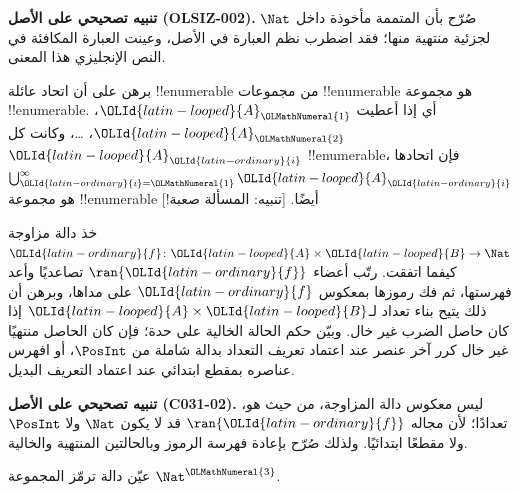 \documentclass[../../../include/open-logic-section]{subfiles}
\begin{document}
\begin{editorial}
\textbf{تنبيه تصحيحي على الأصل (OLSIZ-002).} صُرّح بأن المتممة مأخوذة
داخل $\Nat$ لجزئية منتهية منها؛ فقد اضطرب نظم العبارة في الأصل،
وعينت العبارة المكافئة في النص الإنجليزي هذا المعنى.
\end{editorial}

\begin{prob}
برهن على أن اتحاد عائلة !!{enumerable} من مجموعات !!{enumerable}
هو مجموعة !!{enumerable}. أي إذا أعطيت ${\OLId{latin-looped}{A}}_{\OLMathNumeral{1}}$، ${\OLId{latin-looped}{A}}_{\OLMathNumeral{2}}$، \dots{}، وكانت كل
${\OLId{latin-looped}{A}}_{\OLId{latin-ordinary}{i}}$ !!{enumerable}، فإن اتحادها $\bigcup_{{\OLId{latin-ordinary}{i}}={\OLMathNumeral{1}}}^\infty
{\OLId{latin-looped}{A}}_{\OLId{latin-ordinary}{i}}$ هو مجموعة !!{enumerable} أيضًا. [تنبيه: المسألة صعبة!]
\end{prob}

\begin{prob}
خذ دالة مزاوجة ${\OLId{latin-ordinary}{f}} \colon {\OLId{latin-looped}{A}} \times {\OLId{latin-looped}{B}} \to \Nat$ كيفما اتفقت.
رتّب أعضاء $\ran{{\OLId{latin-ordinary}{f}}}$ تصاعديًا وأعد فهرستها، ثم فك رموزها بمعكوس ${\OLId{latin-ordinary}{f}}$
على مداها، وبرهن أن ذلك يتيح بناء تعداد لـ${\OLId{latin-looped}{A}} \times {\OLId{latin-looped}{B}}$ إذا كان حاصل
الضرب غير خال. وبيّن حكم الحالة الخالية على حدة؛ فإن كان الحاصل منتهيًا
غير خال كرر آخر عنصر عند اعتماد تعريف التعداد بدالة شاملة من $\PosInt$،
أو افهرس عناصره بمقطع ابتدائي عند اعتماد التعريف البديل.
\end{prob}

\textbf{تنبيه تصحيحي على الأصل (C031-02).} ليس معكوس دالة المزاوجة، من حيث هو،
تعدادًا؛ لأن مجاله $\ran{{\OLId{latin-ordinary}{f}}}$ قد لا يكون $\Nat$ ولا $\PosInt$ ولا مقطعًا
ابتدائيًا. ولذلك صُرّح بإعادة فهرسة الرموز وبالحالتين المنتهية والخالية.

\begin{prob}
عيّن دالة ترمّز المجموعة $\Nat^{\OLMathNumeral{3}}$.
\end{prob}
\end{document}
